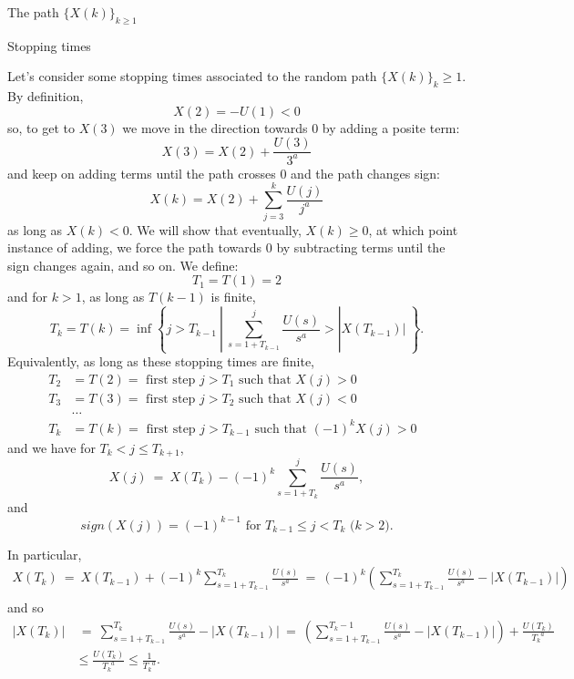 \documentclass[12pt]{article}
\begin{document}
\begin{section}{The path $\{X(k)\}_{k\ge1}$ }  


\begin{subsection}{Stopping times} 
		
\hspace{20pt}Let's consider some stopping times associated to the random path $\{X(k)\}_k\ge1$. By definition,
$$
X(2)=- U(1) <0 
$$ 
so, to get to $X(3)$ we move in the direction towards $0$ by adding a posite term: 
$$
X(3) = X(2) + \frac{U(3)}{3^a}
$$ 
and keep on adding terms until the path crosses $0$ and the path changes sign:
$$
X(k) = X(2) + \sum_{j=3}^{k} \frac{U(j)}{j^a}
$$
as long as $X(k) < 0$. We will show that eventually, $X(k) \ge 0$, at which point instance of adding, we force the path towards $0$ by subtracting terms until the sign changes again, and so on. We define:
\begin{equation}
T_1 = T(1) = 2
\end{equation}
and for $k>1$, as long as $T(k-1)$ is finite,
\begin{equation}
T_k = T(k) = \inf\left\{j > T_{k-1} \ | \  \sum_{s=1+T_{k-1}}^{j} \frac{U(s)}{s^a} > |X(T_{k-1})|  \   \right\}.
\end{equation}
  Equivalently, as long as these stopping times are finite,
 \begin{align*}
 T_2 &= T(2) = \text{ first step $j > T_1$ such that $X(j) > 0$} \\
  T_3 &= T(3) = \text{ first step $j > T_2$ such that $X(j) < 0$} \\
  &\dots \\
  T_k &= T(k) = \text{ first step $j > T_{k-1}$ such that $(-1)^k X(j) > 0$ } 
 \end{align*} 
and we have for $T_{k} <j\le T_{k+1}$,
\begin{equation} \label{eq:Xj}
X(j) ~=~ X(T_{k}) - (-1)^k \sum_{s=1+T_{k}}^{j} \frac{U(s)}{s^a},
\end{equation}
and
\begin{equation}
sign(X(j)) = (-1)^{k-1} \text{ for $T_{k-1} \le j < T_k$ ($k>2$)}.
\end{equation}

In particular,
\begin{align*}
X(T_k) ~=~ X(T_{k-1}) + (-1)^k \sum_{s=1+T_{k-1}}^{T_k} \frac{U(s)}{s^a}  
~=~ (-1)^{k} \left( \sum_{s=1+T_{k-1}}^{T_k} \frac{U(s)}{s^a} - |X(T_{k-1})| \right)   \\
\end{align*}
and so
\begin{align} \label{eq:XleT}
|X(T_k)| &~=~ \sum_{s=1+T_{k-1}}^{T_k} \frac{U(s)}{s^a} - |X(T_{k-1})| ~=~ \left( \sum_{s=1+T_{k-1}}^{T_k-1} \frac{U(s)}{s^a} - |X(T_{k-1})| \right) +
 \frac{U(T_k)}{{T_k}^a}   \nonumber\\
 &\le \frac{U(T_k)}{{T_k}^a} \le \frac{1}{{T_k}^a}.
\end{align}  


\end{subsection}
\end{section}
\end{document}
